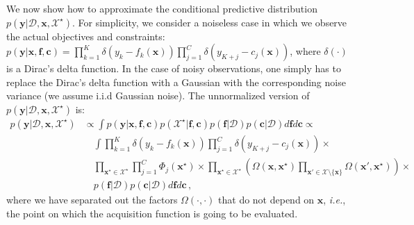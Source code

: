 \documentclass[review,preprint,12pt]{elsarticle}
\begin{document}
We now show how to approximate the conditional predictive distribution 
$p(\textbf{y}|\mathcal{D}, \textbf{x}, \mathcal{X}^{\star})$. For simplicity, 
we consider a noiseless case in which we observe the actual objectives and constraints: 
$p(\textbf{y}|\textbf{x},\textbf{f},\textbf{c}) = \prod_{k=1}^{K}\delta(y_k - 
f_k(\textbf{x})) \prod_{j=1}^{C}\delta (y_{K+j} - c_j(\textbf{x}))$, where $\delta(\cdot)$ is a 
Dirac's delta function. In the case of noisy observations, one simply has
to replace the Dirac's delta function with a Gaussian with the corresponding noise variance (we assume 
i.i.d Gaussian noise). The unnormalized version of $p(\textbf{y}|\mathcal{D}, \textbf{x}, \mathcal{X}^{\star})$ 
is:
\begin{align}
p(\textbf{y}|\mathcal{D}, \textbf{x}, \mathcal{X}^{\star}) & \propto 
	\int p(\textbf{y}|\textbf{x},\textbf{f},\textbf{c}) 
	p(\mathcal{X}^{\star}|\textbf{f},\textbf{c}) p(\textbf{f}|\mathcal{D}) p(\textbf{c}|\mathcal{D})
 d\textbf{f} d\textbf{c} \propto \nonumber \\ & \quad
\int \prod\limits_{k=1}^{K} \delta (y_k - f_k(\textbf{x})) \prod\limits_{j=1}^{C} \delta (y_{K+j} - c_j(\textbf{x})) \times \nonumber \\ & \quad 
	\prod_{\textbf{x}^\star\in \mathcal{X}^\star} 
	\prod_{j=1}^{C}\Phi_j(\textbf{x}^{\star})
\times
	\prod_{\textbf{x}^\star \in \mathcal{X}^\star}
	\left(
	\Omega(\textbf{x},\textbf{x}^{\star})
	\prod_{\textbf{x}'\in \mathcal{X} \setminus \{\mathbf{x}\}} 
	\Omega(\textbf{x}',\textbf{x}^{\star})
	\right) \times \nonumber \\ & \quad
	p(\textbf{f}|\mathcal{D})p(\textbf{c}|\mathcal{D}) d\textbf{f}d\textbf{c}\,,
	\label{eq:exact_acq}
\end{align}
where we have separated out the factors $\Omega(\cdot,\cdot)$ that do not depend on $\mathbf{x}$, \emph{i.e.}, 
the point on which the acquisition function is going to be evaluated. 
\end{document}
